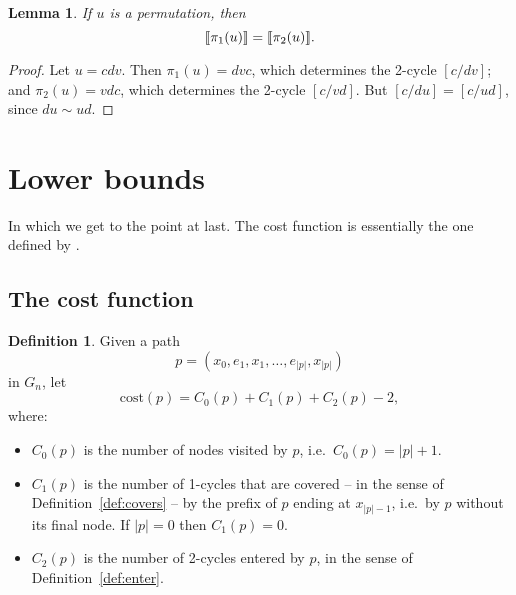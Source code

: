 \documentclass[a4paper]{article}
\newtheorem{lemma}{Lemma}
\theoremstyle{definition}
\newtheorem{defn}{Definition}[section]
\theoremstyle{remark}
\begin{document}
\begin{lemma}\label{lem:pi12}
    If $u$ is a permutation, then
    \[
        \llbracket\pi_1(u)\rrbracket = \llbracket\pi_2(u)\rrbracket.
    \]
\end{lemma}
\begin{proof}
Let $u = cdv$. Then $\pi_1(u) = dvc$, which determines the 2-cycle $[c/dv]$; and $\pi_2(u) = vdc$, which determines the 2-cycle $[c/vd]$. But $[c/du] = [c/ud]$, since $du \sim ud$.
\end{proof}

\section{Lower bounds}
In which we get to the point at last. The cost function is essentially the one defined by \citet{Anonymous}.

\subsection{The cost function}
\def\cost{\mathrm{cost}}

\begin{defn}\label{def:cost}
    Given a path \[
        p = (x_0, e_1, x_1, \dots, e_{|p|}, x_{|p|})
    \] in $G_n$, let \[
        \cost(p) = C_0(p) + C_1(p) + C_2(p) - 2,
    \]
    where:
    \begin{itemize}
    \item $C_0(p)$ is the number of nodes visited by $p$, i.e.\ $C_0(p) = |p| + 1$.
    \item $C_1(p)$ is the number of 1-cycles that are covered -- in the sense of Definition~\ref{def:covers} -- by the prefix of $p$ ending at $x_{|p|-1}$, i.e.\ by $p$ without its final node. If $|p|=0$ then $C_1(p)=0$.
    \item $C_2(p)$ is the number of 2-cycles entered by $p$, in the sense of Definition~\ref{def:enter}.
    \end{itemize}
\end{defn}
\end{document}
